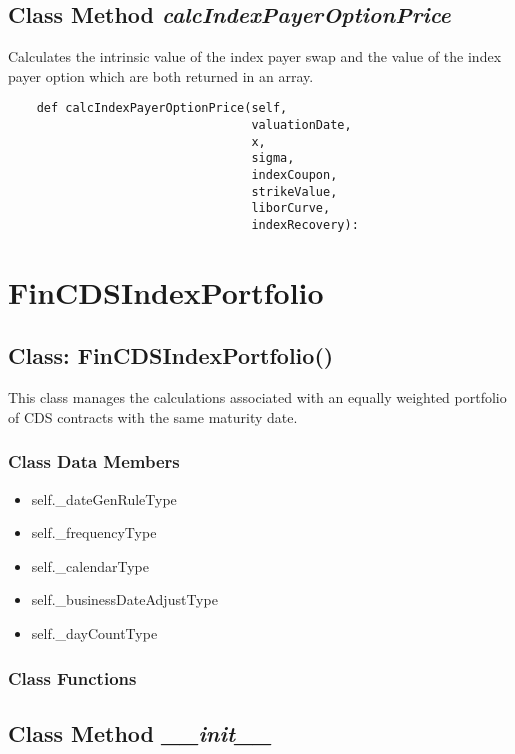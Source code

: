 \documentclass[twoside,11pt]{book}
\begin{document}
\subsection{Class Method {\it calcIndexPayerOptionPrice}}
Calculates the intrinsic value of the index payer swap and the value of the index payer option which are both returned in an array. 

\begin{lstlisting}
    def calcIndexPayerOptionPrice(self, 
                                  valuationDate,
                                  x,
                                  sigma,
                                  indexCoupon,
                                  strikeValue,
                                  liborCurve,
                                  indexRecovery):
\end{lstlisting}

\newpage
\section{FinCDSIndexPortfolio}

\subsection{Class: FinCDSIndexPortfolio()}
This class manages the calculations associated with an equally weighted portfolio of CDS contracts with the same maturity date. 

\subsubsection{Class Data Members}
\begin{itemize}
\item{self.\_dateGenRuleType}
\item{self.\_frequencyType}
\item{self.\_calendarType}
\item{self.\_businessDateAdjustType}
\item{self.\_dayCountType}
\end{itemize}

\subsubsection{Class Functions}

\subsection{Class Method {\it \_\_init\_\_}}
\end{document}
